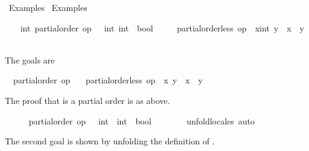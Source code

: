 %
\begin{isabellebody}%
\def\isabellecontext{Examples{\isadigit{2}}}%
%
\isadelimtheory
%
\endisadelimtheory
%
\isatagtheory
{}\isamarkupfalse%
\ Examples{}\isanewline
{}\ Examples\isanewline
{}%
\endisatagtheory
{\isafoldtheory}%
%
\isadelimtheory
%
\endisadelimtheory
%
\begin{isamarkuptext}%
\vspace{-5ex}%
\end{isamarkuptext}%
\isamarkuptrue%
%
\isadelimvisible
\ \ %
\endisadelimvisible
%
\isatagvisible
{}\isamarkupfalse%
\ int{\isacharcolon}\ partial{\isacharunderscore}order\ {\isachardoublequoteopen}op\ {\isasymle}\ {\isacharcolon}{\isacharcolon}\ {\isacharbrackleft}int{\isacharcomma}\ int{\isacharbrackright}\ {\isasymRightarrow}\ bool{\isachardoublequoteclose}\isanewline
\ \ \ \ \ {\isachardoublequoteopen}partial{\isacharunderscore}order{\isachardot}less\ op\ {\isasymle}\ {\isacharparenleft}x{\isacharcolon}{\isacharcolon}int{\isacharparenright}\ y\ {\isacharequal}\ {\isacharparenleft}x\ {\isacharless}\ y{\isacharparenright}{\isachardoublequoteclose}\isanewline
\ \ \isamarkupfalse%
\ {\isacharminus}%
\begin{isamarkuptxt}%
\normalsize The goals are \begin{isabelle}%
\ {}{\isachardot}\ partial{\isacharunderscore}order\ op\ {\isasymle}\isanewline
\ {}{\isachardot}\ partial{\isacharunderscore}order{\isachardot}less\ op\ {\isasymle}\ x\ y\ {\isacharequal}\ {\isacharparenleft}x\ {\isacharless}\ y{\isacharparenright}%
\end{isabelle}
      The proof that \isa{{\isasymle}} is a partial order is as above.%
\end{isamarkuptxt}%
\isamarkuptrue%
\ \ \ \ \isamarkupfalse%
\ {\isachardoublequoteopen}partial{\isacharunderscore}order\ {\isacharparenleft}op\ {\isasymle}\ {\isacharcolon}{\isacharcolon}\ int\ {\isasymRightarrow}\ int\ {\isasymRightarrow}\ bool{\isacharparenright}{\isachardoublequoteclose}\isanewline
\ \ \ \ \ \ \isamarkupfalse%
\ unfold{\isacharunderscore}locales\ auto%
\begin{isamarkuptxt}%
\normalsize The second goal is shown by unfolding the
      definition of .%
\end{isamarkuptxt}%
\isamarkuptrue%
\ \ \ \ \isamarkupfalse%

\end{isabellebody}
